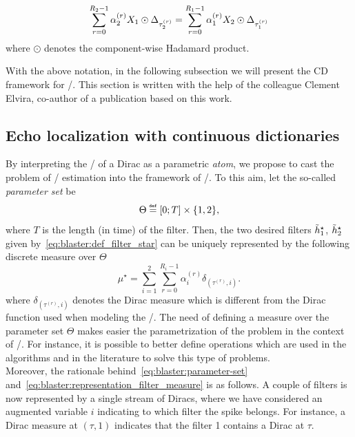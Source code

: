 \begin{equation}
    \label{eq:blaster:cross-relation-approx}
    \sum_{r=0}^{R_2-1} \alpha_2^{(r)} X_1 \odot \Delta_{\tau_{2}^{(r)}}
    =
    \sum_{r=0}^{R_1-1} \alpha_1^{(r)} X_2 \odot \Delta_{\tau_{1}^{(r)}}
\end{equation}
where $\odot$ denotes the component-wise Hadamard product.

\mynewline
With the above notation, in the following subsection we will present the \ac{CD} framework for \AER/.
This section is written with the help of the colleague Clement Elvira, co-author of a publication based on this work.

\subsection{Echo localization with continuous dictionaries}
By interpreting the \FT/ of a Dirac as a parametric \textit{atom}, we propose to cast the problem of \RIR/ estimation into the framework of \CD/.
To this aim, let the so-called \emph{parameter set} be
\begin{equation}
    \label{eq:blaster:parameter-set}
    \Theta \eqdef \kintervcc{0}{T} \times \kbrace{1, 2}
    ,
\end{equation}
where $T$ is the length (in time) of the filter.
Then, the two desired filters  $\tilde{h}_1^\star$, $\tilde{h}_2^\star$ given by~\cref{eq:blaster:def_filter_star} can be uniquely represented by the following discrete measure over $\Theta$
\begin{equation}
    \label{eq:blaster:representation_filter_measure}
    \mu^\star = \sum_{i=1}^{2} \sum_{r=0}^{R_{i}-1} \alpha_{i}^{(r)} \delta_{(\tau^{(r)}, i)}.
\end{equation}
where $\delta_{(\tau^{(r)}, i)}$ denotes the Dirac measure which is different from the Dirac function used when modeling the \RIRs/.
The need of defining a measure over the parameter set $\Theta$ makes easier the parametrization of the problem in the context of \CD/.
For instance, it is possible to better define operations which are used in the algorithms and in the literature to solve this type of problems.
\\Moreover, the rationale behind~\cref{eq:blaster:parameter-set} and~\cref{eq:blaster:representation_filter_measure} is as follows.
A couple of filters is now represented by a single stream of Diracs, where we have considered an augmented variable $i$ indicating to which filter the spike belongs.
For instance, a Dirac measure at $(\tau, 1)$ indicates that the filter 1 contains a Dirac at $\tau$.

